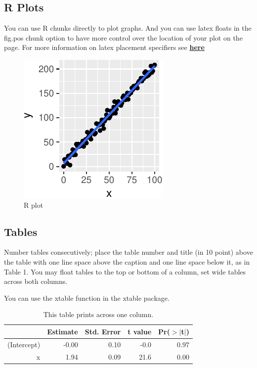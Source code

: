 \documentclass[10pt, letterpaper]{article}
\newenvironment{CodeChunk}{}{}
\begin{document}
\subsection{R Plots}\label{r-plots}

You can use R chunks directly to plot graphs. And you can use latex
floats in the fig.pos chunk option to have more control over the
location of your plot on the page. For more information on latex
placement specifiers see
\textbf{\href{https://en.wikibooks.org/wiki/LaTeX/Floats,_Figures_and_Captions}{here}}

\begin{CodeChunk}
\begin{figure}[H]

{\centering \includegraphics{figs/plot-1} 

}

\caption[R plot]{R plot}\label{fig:plot}
\end{figure}
\end{CodeChunk}

\subsection{Tables}\label{tables}

Number tables consecutively; place the table number and title (in 10
point) above the table with one line space above the caption and one
line space below it, as in Table 1. You may float tables to the top or
bottom of a column, set wide tables across both columns.

You can use the xtable function in the xtable package.

\begin{table}[H]
\centering
\begin{tabular}{rrrrr}
  \hline
 & Estimate & Std. Error & t value & Pr($>$$|$t$|$) \\ 
  \hline
(Intercept) & -0.00 & 0.10 & -0.0 & 0.97 \\ 
  x & 1.94 & 0.09 & 21.6 & 0.00 \\ 
   \hline
\end{tabular}
\caption{This table prints across one column.} 
\end{table}
\end{document}
